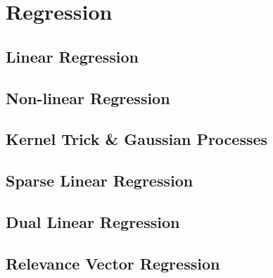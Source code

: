 
\chapter{Regression}
\label{chapter4}

\section{Linear Regression}

\section{Non-linear Regression}

\section{Kernel Trick \& Gaussian Processes}

\section{Sparse Linear Regression}

\section{Dual Linear Regression}

\section{Relevance Vector Regression}

